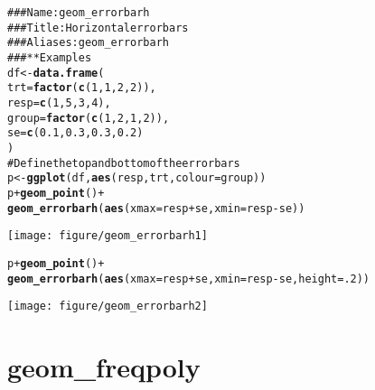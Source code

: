 \documentclass[a4paper,titlepage]{tufte-handout}\usepackage{graphicx, color}
\makeatletter
\def\maxwidth{ %
  \ifdim\Gin@nat@width>\linewidth
    \linewidth
  \else
    \Gin@nat@width
  \fi
}
\newcommand{\hlfunctioncall}[1]{\textcolor[rgb]{0.501960784313725,0,0.329411764705882}{\textbf{#1}}}%
\newcommand{\hlcomment}[1]{\textcolor[rgb]{0.180392156862745,0.6,0.341176470588235}{#1}}%
\newenvironment{kframe}{%
 \def\at@end@of@kframe{}%
 \ifinner\ifhmode%
  \def\at@end@of@kframe{\end{minipage}}%
  \begin{minipage}{\columnwidth}%
 \fi\fi%
 \def\FrameCommand##1{\hskip\@totalleftmargin \hskip-\fboxsep
 \colorbox{shadecolor}{##1}\hskip-\fboxsep
     \hskip-\linewidth \hskip-\@totalleftmargin \hskip\columnwidth}%
 \MakeFramed {\advance\hsize-\width
   \@totalleftmargin\z@ \linewidth\hsize
   \@setminipage}}%
 {\par\unskip\endMakeFramed%
 \at@end@of@kframe}
\newenvironment{knitrout}{}{} %
\makeatother
\begin{document}
\begin{knitrout}
\color{fgcolor}\begin{kframe}
\begin{alltt}
\hlcomment{### Name: geom_errorbarh}
\hlcomment{### Title: Horizontal error bars}
\hlcomment{### Aliases: geom_errorbarh}
\hlcomment{### ** Examples}
df <- \hlfunctioncall{data.frame}(
  trt = \hlfunctioncall{factor}(\hlfunctioncall{c}(1, 1, 2, 2)),
  resp = \hlfunctioncall{c}(1, 5, 3, 4),
  group = \hlfunctioncall{factor}(\hlfunctioncall{c}(1, 2, 1, 2)),
  se = \hlfunctioncall{c}(0.1, 0.3, 0.3, 0.2)
)
\hlcomment{# Define the top and bottom of the errorbars}
p <- \hlfunctioncall{ggplot}(df, \hlfunctioncall{aes}(resp, trt, colour = group))
p + \hlfunctioncall{geom_point}() +
  \hlfunctioncall{geom_errorbarh}(\hlfunctioncall{aes}(xmax = resp + se, xmin = resp - se))
\end{alltt}
\end{kframe}\texttt{[image: figure/geom\_errorbarh1]} \begin{kframe}\begin{alltt}
p + \hlfunctioncall{geom_point}() +
  \hlfunctioncall{geom_errorbarh}(\hlfunctioncall{aes}(xmax = resp + se, xmin = resp - se, height = .2))
\end{alltt}
\end{kframe}\texttt{[image: figure/geom\_errorbarh2]} 
\end{knitrout}


\section{geom\_freqpoly}
\end{document}
